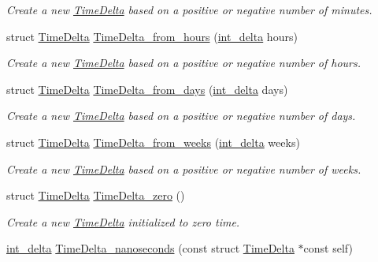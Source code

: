 \begin{DoxyCompactItemize}
\begin{DoxyCompactList}\small\item\em Create a new \hyperlink{structTimeDelta}{Time\-Delta} based on a positive or negative number of minutes. \end{DoxyCompactList}\item 
struct \hyperlink{structTimeDelta}{Time\-Delta} \hyperlink{time-delta_8h_a56f1c443994cd0cbe306cd04e378eabe}{Time\-Delta\-\_\-from\-\_\-hours} (\hyperlink{types_8h_a8a67cf99971c5cfeeaa2380ba84a4c92}{int\-\_\-delta} hours)
\begin{DoxyCompactList}\small\item\em Create a new \hyperlink{structTimeDelta}{Time\-Delta} based on a positive or negative number of hours. \end{DoxyCompactList}\item 
struct \hyperlink{structTimeDelta}{Time\-Delta} \hyperlink{time-delta_8h_a63cc9a37b13e1ea2c9517a15254761dd}{Time\-Delta\-\_\-from\-\_\-days} (\hyperlink{types_8h_a8a67cf99971c5cfeeaa2380ba84a4c92}{int\-\_\-delta} days)
\begin{DoxyCompactList}\small\item\em Create a new \hyperlink{structTimeDelta}{Time\-Delta} based on a positive or negative number of days. \end{DoxyCompactList}\item 
struct \hyperlink{structTimeDelta}{Time\-Delta} \hyperlink{time-delta_8h_adeaef2754da892c29f03834c14ad1204}{Time\-Delta\-\_\-from\-\_\-weeks} (\hyperlink{types_8h_a8a67cf99971c5cfeeaa2380ba84a4c92}{int\-\_\-delta} weeks)
\begin{DoxyCompactList}\small\item\em Create a new \hyperlink{structTimeDelta}{Time\-Delta} based on a positive or negative number of weeks. \end{DoxyCompactList}\item 
struct \hyperlink{structTimeDelta}{Time\-Delta} \hyperlink{time-delta_8h_a4d78cdef19464e2c645923c831f38910}{Time\-Delta\-\_\-zero} ()
\begin{DoxyCompactList}\small\item\em Create a new \hyperlink{structTimeDelta}{Time\-Delta} initialized to zero time. \end{DoxyCompactList}\item 
\hyperlink{types_8h_a8a67cf99971c5cfeeaa2380ba84a4c92}{int\-\_\-delta} \hyperlink{time-delta_8h_a6bb384cf10338d51d1e40fdde5d032b8}{Time\-Delta\-\_\-nanoseconds} (const struct \hyperlink{structTimeDelta}{Time\-Delta} $\ast$const self)

\end{DoxyCompactItemize}
